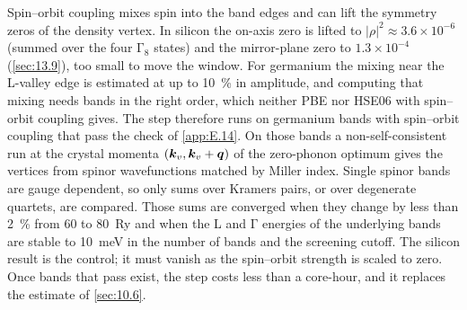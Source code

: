 Spin--orbit coupling mixes spin into the band edges and can lift the symmetry zeros of the density vertex. In silicon the on-axis zero is lifted to $|\rho|^2 \approx 3.6\times10^{-6}$ (summed over the four $\mathrm{\Gamma}_8$ states) and the mirror-plane zero to $1.3\times10^{-4}$ (\cref{sec:13.9}), too small to move the window. For germanium the mixing near the L-valley edge is estimated at up to \SI{10}{\percent} in amplitude, and computing that mixing needs bands in the right order, which neither PBE nor HSE06 with spin--orbit coupling gives. The step therefore runs on germanium bands with spin--orbit coupling that pass the check of \cref{app:E.14}. On those bands a non-self-consistent run at the crystal momenta $(\bm{k}_v, \bm{k}_v+\bm{q})$ of the zero-phonon optimum gives the vertices from spinor wavefunctions matched by Miller index. Single spinor bands are gauge dependent, so only sums over Kramers pairs, or over degenerate quartets, are compared. Those sums are converged when they change by less than \SI{2}{\percent} from 60 to \SI{80}{Ry} and when the L and $\mathrm{\Gamma}$ energies of the underlying bands are stable to \SI{10}{meV} in the number of bands and the screening cutoff. The silicon result is the control; it must vanish as the spin--orbit strength is scaled to zero. Once bands that pass exist, the step costs less than a core-hour, and it replaces the estimate of \cref{sec:10.6}.
